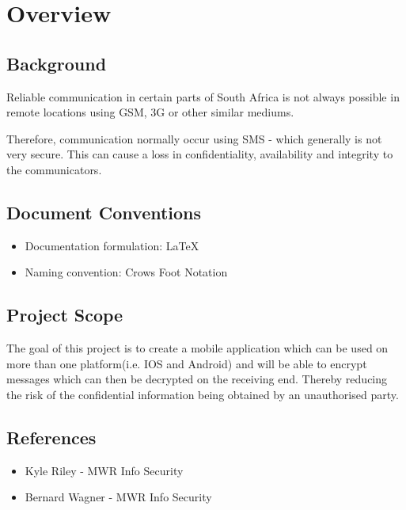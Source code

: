 \documentclass[12pt, a4paper]{article}
\begin{document}





\tableofcontents

\newpage

\section{Overview}

\subsection{Background}
Reliable communication in certain parts of South Africa is not always possible in remote locations using GSM, 3G or other similar mediums.

Therefore, communication normally occur using SMS - which generally is not very secure. This can cause a loss in confidentiality, availability and integrity to the communicators.



\subsection{Document Conventions}
\begin{itemize}
\item Documentation formulation: LaTeX
\item Naming convention: Crows Foot Notation
\end{itemize}


\subsection{Project Scope}
The goal of this project is to create a mobile application which can be used on more than one platform(i.e. IOS and Android) and will be able to encrypt messages which can then be decrypted on the receiving end. Thereby reducing the risk of the confidential information being obtained by an unauthorised party.

\subsection{References}
\begin{itemize}
\item{Kyle Riley - MWR Info Security}
\item{Bernard Wagner - MWR Info Security}
\end{itemize}









\end{document}
